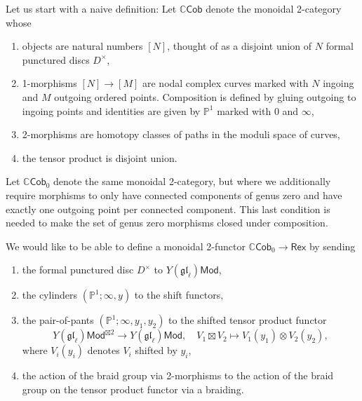 \documentclass[11pt]{report}
\theoremstyle{definition}
\theoremstyle{remark}
\theoremstyle{remark}
\newcommand{\C}{\mathbb{C}}
\renewcommand{\P}{\mathbb{P}}
\begin{document}
Let us start with a naive definition: Let $\C\mathsf{Cob}$ denote the monoidal 2-category whose
\begin{enumerate}[label=(\roman*)]
\item objects are natural numbers $[N]$, thought of as a disjoint union of $N$ formal punctured discs $D^\times$,
\item 1-morphisms $[N] \to [M]$ are nodal complex curves marked with $N$ ingoing and $M$ outgoing ordered points. Composition is defined by gluing outgoing to ingoing points and identities are given by $\P^1$ marked with $0$ and $\infty$,
\item 2-morphisms are homotopy classes of paths in the moduli space of curves,
\item the tensor product is disjoint union.
\end{enumerate}
Let $\C\mathsf{Cob}_0$ denote the same monoidal 2-category, but where we additionally require morphisms to only have connected components of genus zero and have exactly one outgoing point per connected component. This last condition is needed to make the set of genus zero morphisms closed under composition.

We would like to be able to define a monoidal 2-functor $\C\mathsf{Cob}_0 \to \mathsf{Rex}$ by sending
\begin{enumerate}[label=(\roman*)]
\item the formal punctured disc $D^\times$ to $Y(\mathfrak{gl}_\ell)\mathsf{Mod}$,
\item the cylinders $(\P^1;\infty,y)$ to the shift functors,
\item the pair-of-pants $(\P^1;\infty,y_1,y_2)$ to the shifted tensor product functor
\begin{equation*}
Y(\mathfrak{gl}_\ell)\mathsf{Mod}^{\boxtimes 2} \to Y(\mathfrak{gl}_\ell)\mathsf{Mod}, \quad V_1 \boxtimes V_2 \mapsto V_1(y_1) \otimes V_2(y_2),
\end{equation*}
where $V_i(y_i)$ denotes $V_i$ shifted by $y_i$,
\item the action of the braid group via 2-morphisms to the action of the braid group on the tensor product functor via a braiding.
\end{enumerate}
\end{document}
